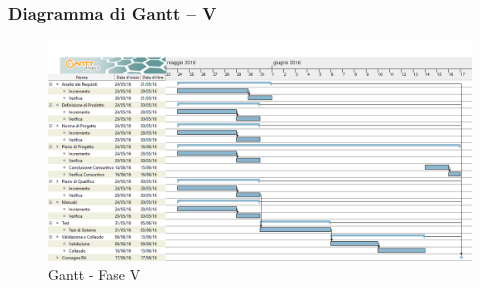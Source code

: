 \documentclass[../PianoProgetto.tex]{subfiles}
\begin{document}
		\subsubsection{Diagramma di Gantt – V}
			\begin{figure}[!h]
				\centering
				\includegraphics[width=\textwidth]{gantt_png/7-verifica}
				\caption{Gantt - Fase V}
				\label{fig:Gantt - Fase V}
			\end{figure}
			
\end{document}

